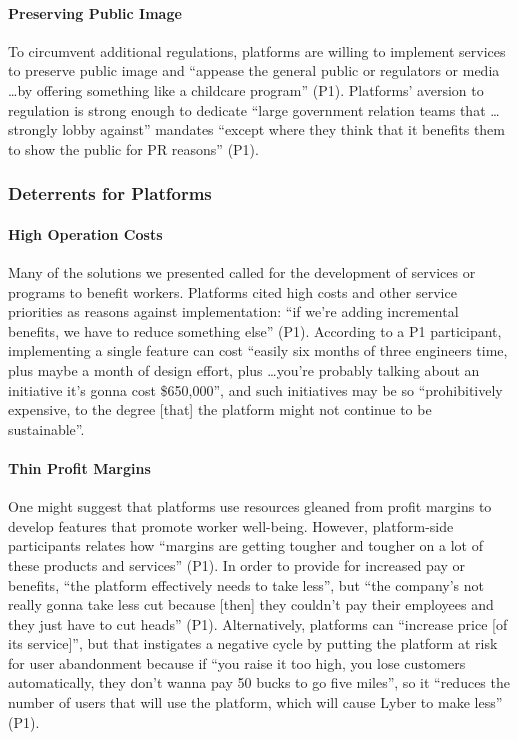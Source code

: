 \paragraph{Preserving Public Image}
To circumvent additional regulations, platforms are willing to implement services to preserve public image and ``appease the general public or regulators or media \dots by offering something like a childcare program'' (P1). Platforms' aversion to regulation is strong enough to dedicate ``large government relation teams that \dots strongly lobby against'' mandates ``except where they think that it benefits them to show the public for PR reasons'' (P1).

\subsubsection{Deterrents for Platforms}
\paragraph{High Operation Costs}
Many of the solutions we presented called for the development of services or programs to benefit workers. Platforms cited high costs and other service priorities as reasons against implementation:  ``if we're adding incremental benefits, we have to reduce something else'' (P1). According to a P1 participant,  implementing a single feature can cost ``easily six months of three engineers time, plus maybe a month of design effort, plus \dots you're probably talking about an initiative it's gonna cost \$650,000'', and such initiatives may be so ``prohibitively expensive, to the degree [that] the platform might not continue to be sustainable''.

\paragraph{Thin Profit Margins}
One might suggest that platforms use resources gleaned from profit margins to develop features that promote worker well-being. However, platform-side participants relates how ``margins are getting tougher and tougher on a lot of these products and services'' (P1). In order to provide for increased pay or benefits, ``the platform effectively needs to take less'', but ``the company's not really gonna take less cut because [then] they couldn't pay their employees and they just have to cut heads'' (P1). Alternatively, platforms can ``increase price [of its service]'', but that instigates a negative cycle by putting the platform at risk for user abandonment because if ``you raise it too high, you lose customers automatically, they don't wanna pay 50 bucks to go five miles'', so it ``reduces the number of users that will use the platform, which will cause Lyber to make less'' (P1).

